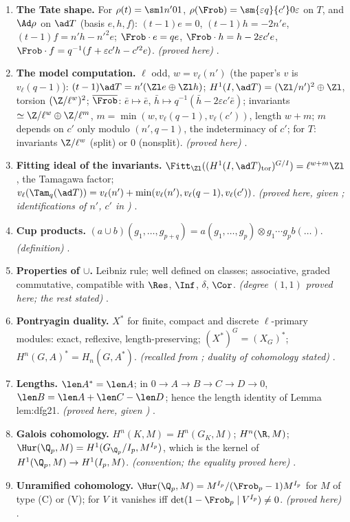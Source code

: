 \begin{enumerate}[label=\textbf{\thechapter.\arabic*}]
\item \textbf{The Tate shape.} For $\rho(t)=\sm1{n'}01$, $\rho(\Frob)=\sm{\varepsilon q}{c'}0\varepsilon$ on $T$, and $\Ad\rho$ on $\ad T$ (basis $e,h,f$): $(t-1)e=0$, $(t-1)h=-2n'e$, $(t-1)f=n'h-n'^2e$; $\Frob\cdot e=qe$,
$\Frob\cdot h=h-2\varepsilon c'e$, $\Frob\cdot f=q^{-1}(f+\varepsilon c'h-c'^2e)$. \emph{(proved here)} .
\item \textbf{The model computation.} $\ell$ odd, $w=v_\ell(n')$ (the paper's $v$ is $v_\ell(q-1)$): $(t-1)\ad T=n'(\Zl e\oplus\Zl h)$; $H^1(I,\ad T)=(\Zl/n')^2\oplus\Zl$, torsion $(\Z/\ell^w)^2$; $\overline\Frob$: $\bar e\mapsto\bar e$,
$\bar h\mapsto q^{-1}(\bar h-2\varepsilon c'\bar e)$; invariants $\simeq\Z/\ell^w\oplus\Z/\ell^m$, $m=\min(w,v_\ell(q-1),v_\ell(c'))$, length $w+m$; $m$ depends on $c'$ only modulo $(n',q-1)$, the
indeterminacy of $c'$; for $T$: invariants $\Z/\ell^w$ (split) or $0$ (nonsplit). \emph{(proved here)} .
\item \textbf{Fitting ideal of the invariants.} $\Fitt_{\Zl}((H^1(I,\ad T)_{\mathrm{tor}})^{G/I})=\ell^{w+m}\Zl$, the Tamagawa factor; $v_\ell(\Tam_q(\ad T))=v_\ell(n')+\min(v_\ell(n'),v_\ell(q-1),v_\ell(c'))$.
\emph{(proved here, given ; identifications of $n'$, $c'$ in )} .
\item \textbf{Cup products.} $(a\cup b)(g_1,\dots,g_{p+q})=a(g_1,\dots,g_p)\otimes g_1\cdots g_pb(\dots)$. \emph{(definition)} .
\item \textbf{Properties of $\cup$.} Leibniz rule; well defined on classes; associative, graded commutative, compatible with $\Res$, $\Inf$, $\delta$, $\Cor$. \emph{(degree $(1,1)$ proved
here; the rest stated)} .
\item \textbf{Pontryagin duality.} $X^*$ for finite, compact and discrete $\ell$-primary modules: exact, reflexive, length-preserving; $(X^*)^G=(X_G)^*$; $H^n(G,A)^*=H_n(G,A^*)$.
\emph{(recalled from ; duality of cohomology stated)} .
\item \textbf{Lengths.} $\len A^*=\len A$; in $0\to A\to B\to C\to D\to0$, $\len B=\len A+\len C-\len D$; hence the length identity of Lemma lem:dfg21. \emph{(proved here, given
)} .
\item \sloppy\textbf{Galois cohomology.} $H^n(K,M)=H^n(G_K,M)$; $H^n(\R,M)$; $\Hur(\Q_p,M)=H^1(G_{\Q_p}/I_p,M^{I_p})$, which is the kernel of $H^1(\Q_p,M)\to H^1(I_p,M)$. \emph{(convention; the equality proved here)}
.
\item \textbf{Unramified cohomology.} $\Hur(\Q_p,M)=M^{I_p}/(\Frob_p-1)M^{I_p}$ for $M$ of type (C) or (V); for $V$ it vanishes iff $\det(1-\Frob_p\mid V^{I_p})\ne0$. \emph{(proved here)}
.
\end{enumerate}

